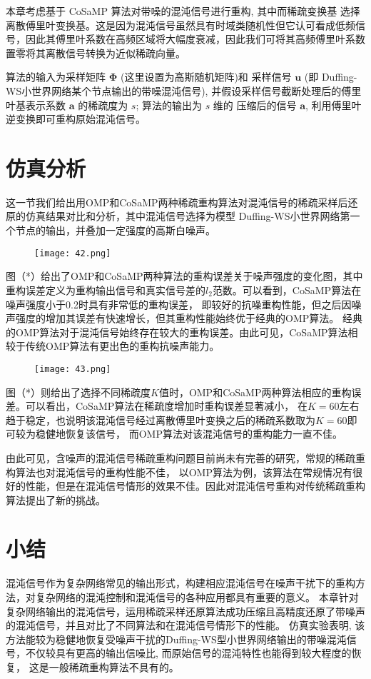 本章考虑基于 CoSaMP 算法对带噪的混沌信号进行重构, 其中而稀疏变换基 选择离散傅里叶变换基。这是因为混沌信号虽然具有时域类随机性但它认可看成低频信号，因此其傅里叶系数在高频区域将大幅度衰减，因此我们可将其高频傅里叶系数置零将其离散信号转换为近似稀疏向量。

算法的输入为采样矩阵 $\boldsymbol{\Phi}$ (这里设置为高斯随机矩阵)和 采样信号 $\boldsymbol{u}$
(即 Duffing-WS小世界网络某个节点输出的带噪混沌信号), 并假设采样信号截断处理后的傅里叶基表示系数 $\boldsymbol{a}$
的稀疏度为 $s$; 算法的输出为 $s$ 维的 压缩后的信号 $\boldsymbol{a}$, 利用傅里叶逆变换即可重构原始混沌信号。


\section{仿真分析}
这一节我们给出用OMP和CoSaMP两种稀疏重构算法对混沌信号的稀疏采样后还原的仿真结果对比和分析，其中混沌信号选择为模型
Duffing-WS小世界网络第一个节点的输出，并叠加一定强度的高斯白噪声。\par
\begin{figure}[!htbp]
    \centering
    \texttt{[image: 42.png]}
\end{figure}
图（*）给出了OMP和CoSaMP两种算法的重构误差关于噪声强度的变化图，其中重构误差定义为重构输出信号和真实信号差的$l_2$范数。可以看到，CoSaMP算法在噪声强度小于0.2时具有非常低的重构误差，
即较好的抗噪重构性能，但之后因噪声强度的增加其误差有快速增长，但其重构性能始终优于经典的OMP算法。
经典的OMP算法对于混沌信号始终存在较大的重构误差。由此可见，CoSaMP算法相较于传统OMP算法有更出色的重构抗噪声能力。\par
\begin{figure}[!htbp]
    \centering
    \texttt{[image: 43.png]}
\end{figure}

图（*）则给出了选择不同稀疏度$K$值时，OMP和CoSaMP两种算法相应的重构误差。可以看出，CoSaMP算法在稀疏度增加时重构误差显著减小，
在$K = 60$左右趋于稳定，也说明该混沌信号经过离散傅里叶变换之后的稀疏系数取为$K = 60$即可较为稳健地恢复该信号，
而OMP算法对该混沌信号的重构能力一直不佳。\par
由此可见，含噪声的混沌信号稀疏重构问题目前尚未有完善的研究，常规的稀疏重构算法也对混沌信号的重构性能不佳，
以OMP算法为例，该算法在常规情况有很好的性能，但是在混沌信号情形的效果不佳。因此对混沌信号重构对传统稀疏重构算法提出了新的挑战。
\section{小结}
混沌信号作为复杂网络常见的输出形式，构建相应混沌信号在噪声干扰下的重构方法，对复杂网络的混沌控制和混沌信号的各种应用都具有重要的意义。
本章针对复杂网络输出的混沌信号，运用稀疏采样还原算法成功压缩且高精度还原了带噪声的混沌信号，并且对比了不同算法和在混沌信号情形下的性能。
仿真实验表明, 该方法能较为稳健地恢复受噪声干扰的Duffing-WS型小世界网络输出的带噪混沌信号，不仅较具有更高的输出信噪比, 而原始信号的混沌特性也能得到较大程度的恢复，
这是一般稀疏重构算法不具有的。